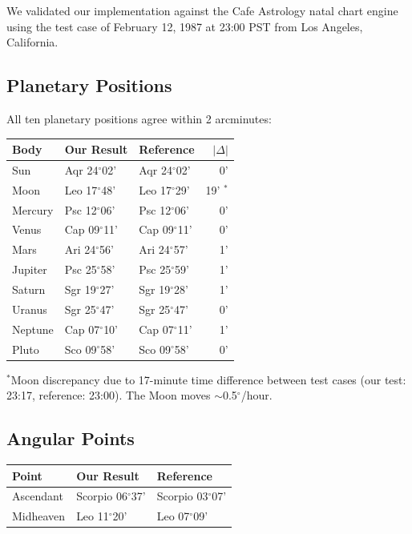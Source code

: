 \documentclass[11pt,letterpaper,twocolumn]{article}
\begin{document}
We validated our implementation against the Cafe Astrology natal chart engine using the test case of February 12, 1987 at 23:00 PST from Los Angeles, California.

\subsection{Planetary Positions}

All ten planetary positions agree within 2 arcminutes:

\begin{center}
\small
\begin{tabular}{lllr}
\toprule
\textbf{Body} & \textbf{Our Result} & \textbf{Reference} & \textbf{$|\Delta|$} \\
\midrule
Sun     & Aqr 24$^\circ$02' & Aqr 24$^\circ$02' & 0' \\
Moon    & Leo 17$^\circ$48' & Leo 17$^\circ$29' & 19' ${}^*$ \\
Mercury & Psc 12$^\circ$06' & Psc 12$^\circ$06' & 0' \\
Venus   & Cap 09$^\circ$11' & Cap 09$^\circ$11' & 0' \\
Mars    & Ari 24$^\circ$56' & Ari 24$^\circ$57' & 1' \\
Jupiter & Psc 25$^\circ$58' & Psc 25$^\circ$59' & 1' \\
Saturn  & Sgr 19$^\circ$27' & Sgr 19$^\circ$28' & 1' \\
Uranus  & Sgr 25$^\circ$47' & Sgr 25$^\circ$47' & 0' \\
Neptune & Cap 07$^\circ$10' & Cap 07$^\circ$11' & 1' \\
Pluto   & Sco 09$^\circ$58' & Sco 09$^\circ$58' & 0' \\
\bottomrule
\end{tabular}
\end{center}

${}^*$Moon discrepancy due to 17-minute time difference between test cases (our test: 23:17, reference: 23:00). The Moon moves $\sim$0.5$^\circ$/hour.

\subsection{Angular Points}

\begin{center}
\begin{tabular}{lll}
\toprule
\textbf{Point} & \textbf{Our Result} & \textbf{Reference} \\
\midrule
Ascendant & Scorpio 06$^\circ$37' & Scorpio 03$^\circ$07' \\
Midheaven & Leo 11$^\circ$20' & Leo 07$^\circ$09' \\
\bottomrule
\end{tabular}
\end{center}
\end{document}
